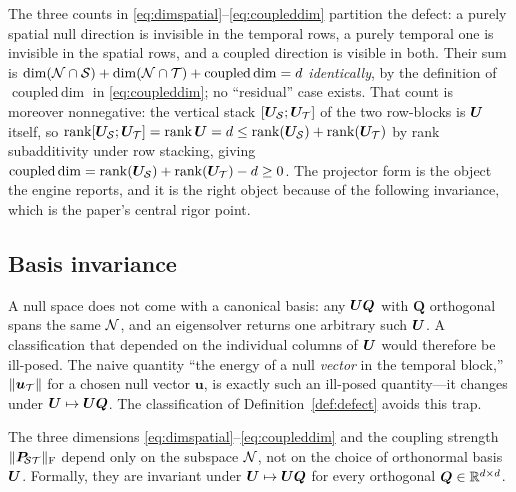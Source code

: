 The three counts in \eqref{eq:dimspatial}--\eqref{eq:coupleddim} partition the defect: a
purely spatial null direction is invisible in the temporal rows, a purely temporal one is
invisible in the spatial rows, and a coupled direction is visible in both. Their sum is
$\dim(\mathcal{N}\cap\mathcal{S})+\dim(\mathcal{N}\cap\mathcal{T})+\operatorname{coupled\,dim}=d$ \emph{identically},
by the definition of $\operatorname{coupled\,dim}$ in \eqref{eq:coupleddim}; no
``residual'' case exists. That count is moreover nonnegative: the vertical stack
$[\bm{U}_{\mathcal{S}};\bm{U}_{\mathcal{T}}]$ of the two row-blocks is $\bm{U}$ itself, so
$\operatorname{rank}[\bm{U}_{\mathcal{S}};\bm{U}_{\mathcal{T}}]=\operatorname{rank}\bm{U}=d\le\operatorname{rank}(\bm{U}_{\mathcal{S}})+\operatorname{rank}(\bm{U}_{\mathcal{T}})$
by rank subadditivity under row stacking, giving
$\operatorname{coupled\,dim}=\operatorname{rank}(\bm{U}_{\mathcal{S}})+\operatorname{rank}(\bm{U}_{\mathcal{T}})-d\ge0$. The projector
form is the object the engine reports, and it is the right object because of the following
invariance, which is the paper's central rigor point.

\subsection{Basis invariance}
\label{sec:invariance}

A null space does not come with a canonical basis: any $\bm{U}\bm Q$ with $\bm Q$ orthogonal
spans the same $\mathcal{N}$, and an eigensolver returns one arbitrary such $\bm{U}$. A
classification that depended on the individual columns of $\bm{U}$ would therefore be
ill-posed. The naive quantity ``the energy of a null \emph{vector} in the temporal block,''
$\lVert\bm u_{\mathcal{T}}\rVert$ for a chosen null vector $\bm u$, is exactly such an ill-posed
quantity---it changes under $\bm{U}\mapsto\bm{U}\bm Q$. The classification of
Definition~\ref{def:defect} avoids this trap.

\begin{proposition}
\label{prop:invariance}
The three dimensions \eqref{eq:dimspatial}--\eqref{eq:coupleddim} and the coupling strength
$\lVert\bm{P}_{\!\mathcal{S}\mathcal{T}}\rVert_{\mathrm F}$ depend only on the subspace $\mathcal{N}$, not on the choice of
orthonormal basis $\bm{U}$. Formally, they are invariant under $\bm{U}\mapsto\bm{U}\bm Q$ for
every orthogonal $\bm Q\in\mathbb{R}^{d\times d}$.
\end{proposition}

